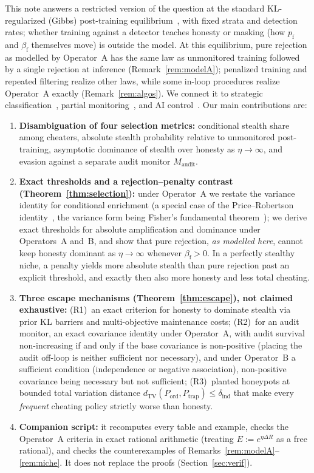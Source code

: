 \documentclass[11pt,a4paper]{article}
\newcommand{\dTV}{d_{\mathrm{TV}}}
\begin{document}
This note answers a restricted version of the question at the standard KL-regularized (Gibbs) post-training equilibrium~\cite{korbak2022}, with fixed strata and detection rates; whether training against a detector teaches honesty or masking (how $p_{\mathrm{f}}$ and $\beta_{\mathrm{f}}$ themselves move) is outside the model. At this equilibrium, pure rejection as modelled by Operator~A has the same law as unmonitored training followed by a single rejection at inference (Remark~\ref{rem:modelA}); penalized training and repeated filtering realize other laws, while some in-loop procedures realize Operator~A exactly (Remark~\ref{rem:algos}). We connect it to strategic classification~\cite{hardt2016}, partial monitoring~\cite{bartok2014}, and AI control~\cite{greenblatt2023,griffin2024,terekhov2025,ukaisi2025}. Our main contributions are:
\begin{enumerate}
  \item \textbf{Disambiguation of four selection metrics:} conditional stealth share among cheaters, absolute stealth probability relative to unmonitored post-training, asymptotic dominance of stealth over honesty as $\eta \to \infty$, and evasion against a separate audit monitor $M_{\mathrm{audit}}$.
  \item \textbf{Exact thresholds and a rejection--penalty contrast (Theorem~\ref{thm:selection}):} under Operator~A we restate the variance identity for conditional enrichment (a special case of the Price--Robertson identity~\cite{price1970,robertson1966}, the variance form being Fisher's fundamental theorem~\cite{fisher1930}); we derive exact thresholds for absolute amplification and dominance under Operators~A and~B, and show that pure rejection, \emph{as modelled here}, cannot keep honesty dominant as $\eta \to \infty$ whenever $\beta_{\mathrm{f}} > 0$. In a perfectly stealthy niche, a penalty yields more absolute stealth than pure rejection past an explicit threshold, and exactly then also more honesty and less total cheating.
  \item \textbf{Three escape mechanisms (Theorem~\ref{thm:escape}), not claimed exhaustive:} (R1)~an exact criterion for honesty to dominate stealth via prior KL barriers and multi-objective maintenance costs; (R2)~for an audit monitor, an exact covariance identity under Operator~A, with audit survival non-increasing if and only if the base covariance is non-positive (placing the audit off-loop is neither sufficient nor necessary), and under Operator~B a sufficient condition (independence or negative association), non-positive covariance being necessary but not sufficient; (R3)~planted honeypots at bounded total variation distance $\dTV(P_{\mathrm{ord}}, P_{\mathrm{trap}}) \le \delta_{\mathrm{ind}}$ that make every \emph{frequent} cheating policy strictly worse than honesty.
  \item \textbf{Companion script:} it recomputes every table and example, checks the Operator~A criteria in exact rational arithmetic (treating $E := e^{\eta\Delta R}$ as a free rational), and checks the counterexamples of Remarks~\ref{rem:modelA}--\ref{rem:niche}. It does not replace the proofs (Section~\ref{sec:verif}).
\end{enumerate}
\end{document}
